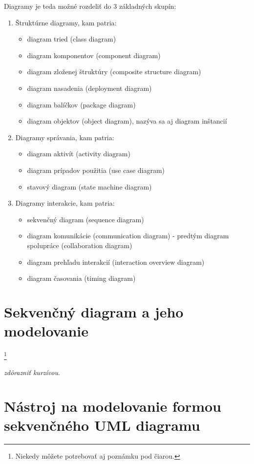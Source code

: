 \documentclass[10pt,twoside,slovak,a4paper]{article}
\begin{document}
 Diagramy je teda možné rozdeliť do 3 základných skupín\cite{WIKI}:

\begin{enumerate}
\item Štruktúrne diagramy, kam patria:
	\begin{itemize}
	\item diagram tried (class diagram)
	\item diagram komponentov (component diagram)
	\item diagram zloženej štruktúry (composite structure diagram)
	\item diagram nasadenia (deployment diagram)
	\item diagram balíčkov (package diagram)
	\item diagram objektov (object diagram), nazýva sa aj diagram inštancií
	\end{itemize}
\item Diagramy správania, kam patria:
	\begin{itemize}
	\item diagram aktivít (activity diagram)
	\item diagram prípadov použitia (use case diagram)
	\item stavový diagram (state machine diagram)
	\end{itemize}
\newpage
\item Diagramy interakcie, kam patria:
	\begin{itemize}
	\item sekvenčný diagram (sequence diagram)
	\item diagram komunikácie (communication diagram) - predtým diagram spolupráce (collaboration diagram)
	\item diagram prehľadu interakcií (interaction overview diagram)
	\item diagram časovania (timing diagram)
	\end{itemize}
\end{enumerate}



\section{Sekvenčný diagram a jeho modelovanie} \label{3sek}

\footnote{Niekedy môžete potrebovať aj poznámku pod čiarou.}

\emph{zdôrazniť kurzívou}.


\section{Nástroj na modelovanie formou sekvenčného UML diagramu} \label{4sek}
\end{document}
